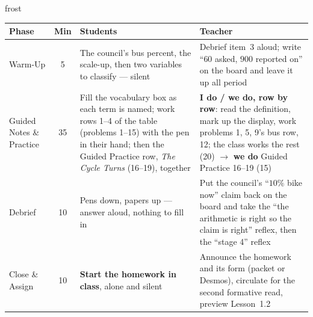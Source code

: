 \documentclass[10pt]{article}
\begin{document}
\begin{fixedskillbox}{frost}
\renewcommand{\arraystretch}{1.25}
\begin{tabularx}{\linewidth}{@{}l c X X@{}}
\textbf{Phase} & \textbf{Min} & \textbf{Students} & \textbf{Teacher} \\
\hline
Warm-Up & 5 & The council's bus percent, the scale-up, then two variables to classify ---
  silent & Debrief item~3 aloud; write ``$60$ asked, $900$ reported on'' on the board and
  leave it up all period \\
Guided Notes \& Practice & 35 & Fill the vocabulary box as each term is named; work rows
  1--4 of the table (problems 1--15) with the pen in their hand; then the Guided Practice row,
  \emph{The Cycle Turns} (16--19), together & \textbf{I do / we do, row by row}: read the
  definition, mark up the display, work problems 1, 5, 9's bus row, 12; the class works the
  rest (20) $\to$ \textbf{we do} Guided Practice 16--19 (15) \\
Debrief & 10 & Pens down, papers up --- answer aloud, nothing to fill in & Put the council's
  ``$10\%$ bike now'' claim back on the board and take the ``the arithmetic is right so the
  claim is right'' reflex, then the ``stage 4'' reflex \\
Close \& Assign & 10 & \textbf{Start the homework in class}, alone and silent & Announce the
  homework and its form (packet or Desmos), circulate for the second formative read, preview
  Lesson~1.2 \\
\end{tabularx}
\end{fixedskillbox}
\end{document}
